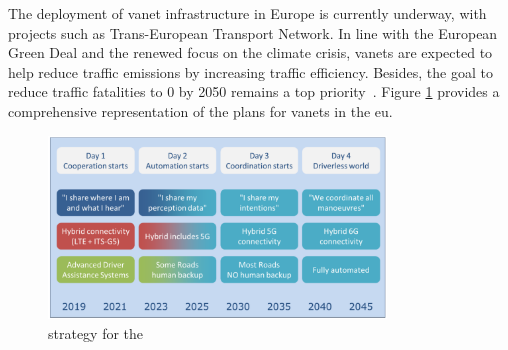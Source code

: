The deployment of \gls{vanet} infrastructure in Europe is currently underway, with projects such as Trans-European Transport Network. In line with the European Green Deal and the renewed focus on the climate crisis, \glspl{vanet} are expected to help reduce traffic emissions by increasing traffic efficiency. Besides, the goal to reduce traffic fatalities to 0 by 2050 remains a top priority~\cite{lu_pan-european_2019}. Figure \ref{fig:EU_strat} provides a comprehensive representation of the plans for \glspl{vanet} in the \gls{eu}.

\begin{figure}[htbp]
    \centering
    \includegraphics[width=0.8\textwidth]{Chapters/Figures/VANETs/ITS_strategy_EU.png}
   	\caption{ strategy for the ~\cite{lu_pan-european_2019}}
   	\label{fig:EU_strat}
\end{figure}




